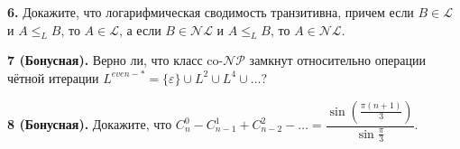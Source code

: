 \documentclass[12pt,a5paper,fleqn]{article}
\begin{document}
\smallskip

{\bf 6.} Докажите, что логарифмическая сводимость транзитивна, причем если $B \in \mathcal{L}$ и $A \leq_L B$, то $A \in \mathcal{L}$, а если $B \in \mathcal{NL}$ и $A \leq_L B$, то $A \in \mathcal{NL}$. 

\smallskip




{\bf 7 (Бонусная).} Верно ли, что класс co-$\mathcal{NP}$ замкнут относительно операции чётной итерации $L^{even-*} = \{\varepsilon\} \cup L^2 \cup L^4 \cup\dotsc$?


{\bf 8 (Бонусная).} Докажите, что $C_n^0-C_{n-1}^1 + C_{n-2}^2-\dotsc = \dfrac{\sin\left(\frac{\pi(n+1)}{3}\right)}{\sin\frac{\pi}{3}}$.
\end{document}

